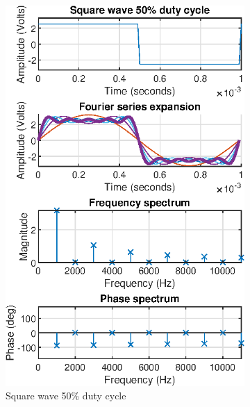 \documentclass[notitlepage, a4paper, 11pt]{article}
\begin{document}
\begin{figure}[H]
\begin{subfigure}[][][t]{0.23\textwidth}
			\includegraphics[width=\textwidth]{../Matlab/img/sqr50}
			\caption{Square wave 50\% duty cycle}
		\end{subfigure}
		\hfill
		\begin{subfigure}[][][t]{0.23\textwidth}

\end{subfigure}
\end{figure}
\end{document}
